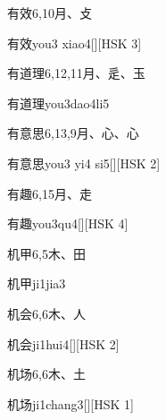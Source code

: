 \begin{entry}{有效}{6,10}{⽉、⽁}
  \begin{phonetics}{有效}{you3 xiao4}[][HSK 3]
  \end{phonetics}
\end{entry}

\begin{entry}{有道理}{6,12,11}{⽉、⾡、⽟}
  \begin{phonetics}{有道理}{you3dao4li5}
  \end{phonetics}
\end{entry}

\begin{entry}{有意思}{6,13,9}{⽉、⼼、⼼}
  \begin{phonetics}{有意思}{you3 yi4 si5}[][HSK 2]
  \end{phonetics}
\end{entry}

\begin{entry}{有趣}{6,15}{⽉、⾛}
  \begin{phonetics}{有趣}{you3qu4}[][HSK 4]
  \end{phonetics}
\end{entry}

\begin{entry}{机甲}{6,5}{⽊、⽥}
  \begin{phonetics}{机甲}{ji1jia3}
  \end{phonetics}
\end{entry}

\begin{entry}{机会}{6,6}{⽊、⼈}
  \begin{phonetics}{机会}{ji1hui4}[][HSK 2]
  \end{phonetics}
\end{entry}

\begin{entry}{机场}{6,6}{⽊、⼟}
  \begin{phonetics}{机场}{ji1chang3}[][HSK 1]
  \end{phonetics}
\end{entry}

